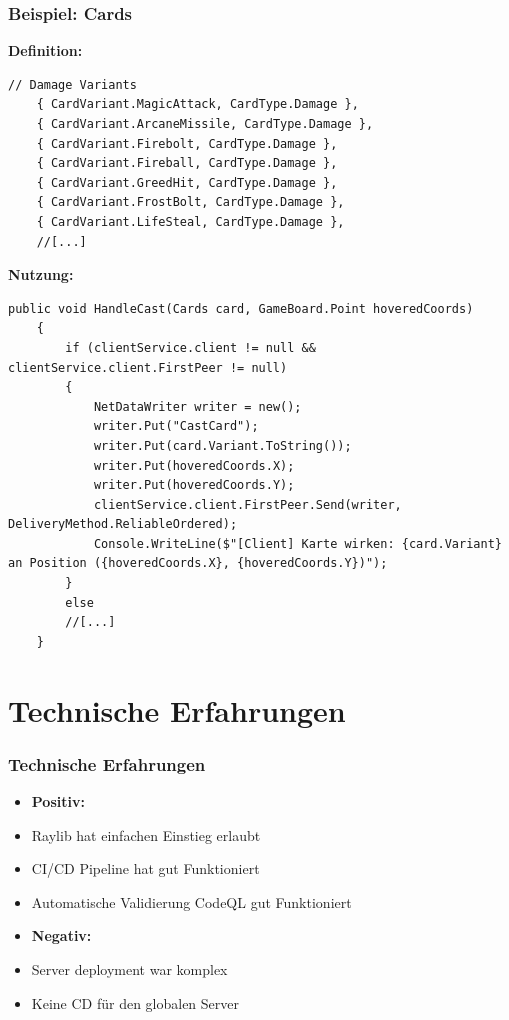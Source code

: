 \documentclass{beamer}
\begin{document}
\begin{frame}[fragile]
  \frametitle{Beispiel: Cards}
  \textbf{Definition: }
  \begin{lstlisting}[language=CSharp, basicstyle=\ttfamily\tiny, breaklines=true]
    // Damage Variants
    { CardVariant.MagicAttack, CardType.Damage },
    { CardVariant.ArcaneMissile, CardType.Damage },
    { CardVariant.Firebolt, CardType.Damage },
    { CardVariant.Fireball, CardType.Damage },
    { CardVariant.GreedHit, CardType.Damage },
    { CardVariant.FrostBolt, CardType.Damage },
    { CardVariant.LifeSteal, CardType.Damage },
    //[...]
  \end{lstlisting}
  \textbf{Nutzung: }
  \begin{lstlisting}[language=CSharp, basicstyle=\ttfamily\tiny, breaklines=true]
    public void HandleCast(Cards card, GameBoard.Point hoveredCoords)
    {
        if (clientService.client != null && clientService.client.FirstPeer != null)
        {
            NetDataWriter writer = new();
            writer.Put("CastCard");
            writer.Put(card.Variant.ToString());
            writer.Put(hoveredCoords.X);
            writer.Put(hoveredCoords.Y);
            clientService.client.FirstPeer.Send(writer, DeliveryMethod.ReliableOrdered);
            Console.WriteLine($"[Client] Karte wirken: {card.Variant} an Position ({hoveredCoords.X}, {hoveredCoords.Y})");
        }
        else
        //[...]
    }
  \end{lstlisting}
\end{frame}

\section{Technische Erfahrungen}
\begin{frame}
\frametitle{Technische Erfahrungen}
  \begin{multicols}{2}
    \begin{itemize}
      \item \textbf{Positiv:}
      \item Raylib hat einfachen Einstieg erlaubt
      \item CI/CD Pipeline hat gut Funktioniert
      \item Automatische Validierung CodeQL gut Funktioniert
    \end{itemize}
    \columnbreak
    \begin{itemize}
      \item \textbf{Negativ:}
      \item Server deployment war komplex
      \item Keine CD für den globalen Server
    \end{itemize}
  \end{multicols}
\end{frame}
\end{document}
